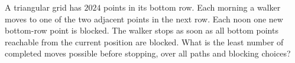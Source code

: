 A triangular grid has $2024$ points in its bottom row. Each morning a walker moves to one of the two adjacent points in the next row. Each noon one new bottom-row point is blocked. The walker stops as soon as all bottom points reachable from the current position are blocked. What is the least number of completed moves possible before stopping, over all paths and blocking choices?
